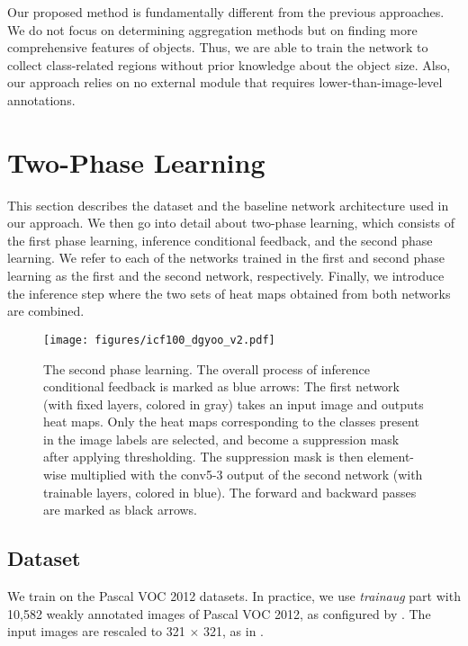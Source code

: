 \documentclass[10pt,twocolumn,letterpaper]{article}
\begin{document}
Our proposed method is fundamentally different from the previous approaches. We do not focus on determining aggregation methods but on finding more comprehensive features of objects. Thus, we are able to train the network to collect class-related regions without prior knowledge about the object size. Also, our approach relies on no external module that requires lower-than-image-level annotations.



\section{Two-Phase Learning}
\label{sec:two_phase_learning}
This section describes the dataset and the baseline network architecture used in our approach. We then go into detail about two-phase learning, which consists of the first phase learning, inference conditional feedback, and the second phase learning. %
We refer to each of the networks trained in the first and second phase learning as the first and the second network, respectively. Finally, we introduce the inference step where the two sets of heat maps obtained from both networks are combined.

\begin{figure*}[t]
\centering
\texttt{[image: figures/icf100\_dgyoo\_v2.pdf]}
\caption{The second phase learning. The overall process of inference conditional feedback is marked as blue arrows: The first network (with fixed layers, colored in gray) takes an input image and outputs heat maps. Only the heat maps corresponding to the classes present in the image labels are selected, and become a suppression mask after applying thresholding. The suppression mask is then element-wise multiplied with the conv5-3 output of the second network (with trainable layers, colored in blue). The forward and backward passes are marked as black arrows.}
\label{fig:feedback}
\end{figure*}
\vspace{-0.1in}


\subsection{Dataset}
We train on the Pascal VOC 2012 datasets. In practice, we use \textit{trainaug} part with 10,582 weakly annotated images of Pascal VOC 2012, as configured by \cite{HariharanABMM11}. The input images are rescaled to 321 $\times$ 321, as in \cite{kolesnikov2016seed}.
\end{document}

